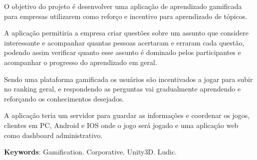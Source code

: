 \setlength{\absparsep}{18pt} %
\begin{resumo}[Abstract]
O objetivo do projeto é desenvolver uma aplicação de aprendizado gamificada para
empresas utilizarem como reforço e incentivo para aprendizado de tópicos.

A aplicação permitiria a empresa criar questões sobre um assunto que considere
interessante e acompanhar quantas pessoas acertaram e erraram cada questão, podendo
assim verificar quanto esse assunto é dominado pelos participantes e acompanhar o
progresso do aprendizado em geral.

Sendo uma plataforma gamificada os usuários são incentivados a jogar para subir
no ranking geral, e respondendo as perguntas vai gradualmente aprendendo e reforçando
os conhecimentos desejados.

A aplicação teria um servidor para guardar as informações e coordenar os jogos,
clientes em PC, Android e IOS onde o jogo será jogado e uma aplicação web como
dashboard administrativo.


 \textbf{Keywords}: Gamification. Corporative. Unity3D. Ludic.
\end{resumo}